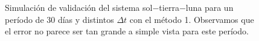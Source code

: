 \begin{figure}
{	\label{fig:ej1_m1_30_12}
	}
	\caption{
		Simulación de validación del sistema sol$-$tierra$-$luna para un período de 30 días y distintos $\Delta t$
		con el método 1.
		Observamos que el error no parece ser tan grande a simple vista para este período.
	}
	\label{ fig:res_ej1_m1_30 }
\end{figure}
